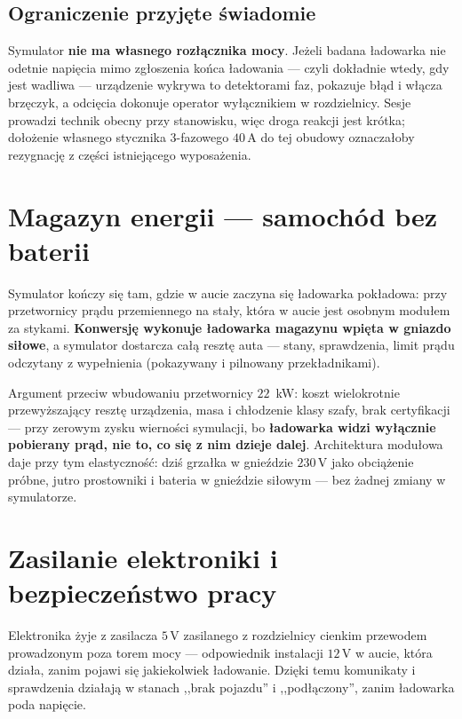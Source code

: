 \documentclass[a4paper,11pt]{article}
\newcommand{\volt}{\,\mathrm{V}}
\newcommand{\amp}{\,\mathrm{A}}
\begin{document}
\subsection{Ograniczenie przyjęte świadomie}

Symulator \textbf{nie ma własnego rozłącznika mocy}. Jeżeli badana ładowarka nie
odetnie napięcia mimo zgłoszenia końca ładowania --- czyli dokładnie wtedy, gdy
jest wadliwa --- urządzenie wykrywa to detektorami faz, pokazuje błąd i włącza
brzęczyk, a odcięcia dokonuje operator wyłącznikiem w rozdzielnicy. Sesje prowadzi
technik obecny przy stanowisku, więc droga reakcji jest krótka; dołożenie własnego
stycznika 3-fazowego $40\amp$ do tej obudowy oznaczałoby rezygnację z części
istniejącego wyposażenia.

\section{Magazyn energii --- samochód bez baterii}

Symulator kończy się tam, gdzie w aucie zaczyna się ładowarka pokładowa: przy
przetwornicy prądu przemiennego na stały, która w aucie jest osobnym modułem za
stykami. \textbf{Konwersję wykonuje ładowarka magazynu wpięta w gniazdo siłowe},
a symulator dostarcza całą resztę auta --- stany, sprawdzenia, limit prądu
odczytany z wypełnienia (pokazywany i pilnowany przekładnikami).

Argument przeciw wbudowaniu przetwornicy $22$~kW: koszt wielokrotnie przewyższający
resztę urządzenia, masa i chłodzenie klasy szafy, brak certyfikacji --- przy zerowym
zysku wierności symulacji, bo \textbf{ładowarka widzi wyłącznie pobierany prąd, nie
to, co się z nim dzieje dalej}. Architektura modułowa daje przy tym elastyczność:
dziś grzałka w gnieździe $230\volt$ jako obciążenie próbne, jutro prostowniki
i bateria w gnieździe siłowym --- bez żadnej zmiany w symulatorze.

\section{Zasilanie elektroniki i bezpieczeństwo pracy}

Elektronika żyje z zasilacza $5\volt$ zasilanego z rozdzielnicy cienkim przewodem
prowadzonym poza torem mocy --- odpowiednik instalacji $12\volt$ w aucie, która
działa, zanim pojawi się jakiekolwiek ładowanie. Dzięki temu komunikaty
i sprawdzenia działają w stanach ,,brak pojazdu'' i ,,podłączony'', zanim ładowarka
poda napięcie.
\end{document}
